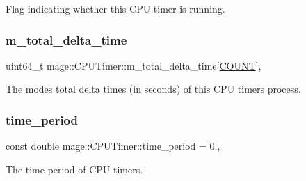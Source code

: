 Flag indicating whether this C\+PU timer is running. \hypertarget{classmage_1_1_c_p_u_timer_aaf482aacb1af55dd559a1d08de104697}{}\label{classmage_1_1_c_p_u_timer_aaf482aacb1af55dd559a1d08de104697} 
\subsubsection{\texorpdfstring{m\+\_\+total\+\_\+delta\+\_\+time}{m\_total\_delta\_time}}
{\footnotesize\ttfamily uint64\+\_\+t mage\+::\+C\+P\+U\+Timer\+::m\+\_\+total\+\_\+delta\+\_\+time\mbox{[}\hyperlink{classmage_1_1_c_p_u_timer_a95a81bb0f32d2cc9881f311a0f6fa895a780a9a1245e4e551833ba02eb606bdf8}{C\+O\+U\+NT}\mbox{]}\hspace{0.3cm}{\ttfamily [mutable]}, {\ttfamily [private]}}

The modes\textquotesingle{} total delta times (in seconds) of this C\+PU timer\textquotesingle{}s process. \hypertarget{classmage_1_1_c_p_u_timer_a9ff7683150a07f2040b660fc3775337b}{}\label{classmage_1_1_c_p_u_timer_a9ff7683150a07f2040b660fc3775337b} 
\subsubsection{\texorpdfstring{time\+\_\+period}{time\_period}}
{\footnotesize\ttfamily const double mage\+::\+C\+P\+U\+Timer\+::time\+\_\+period = 0.\hspace{0.3cm}{\ttfamily [static]}, {\ttfamily [private]}}

The time period of C\+PU timers. 